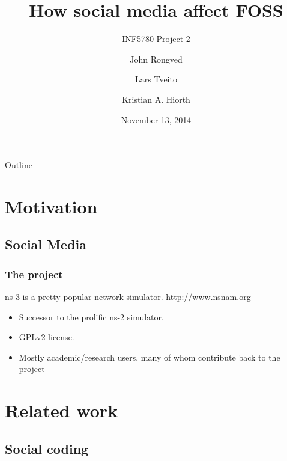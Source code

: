 \documentclass{beamer}
\title{How social media affect FOSS}
\subtitle{INF5780 Project 2}
\author{{John Rongved} \and {Lars Tveito} \and {Kristian A. Hiorth}}
\date{November 13, 2014}
\institute{Department of Informatics\\University of Oslo}
\begin{document}
\begin{frame}
  \titlepage
\end{frame}

\begin{frame}{Outline}
  \tableofcontents{}
\end{frame}

\section{Motivation}

\subsection{Social Media}

\begin{frame}
  \frametitle{The project}
  ns-3 is a pretty popular network simulator. {\small
    \url{http://www.nsnam.org}}

  \begin{itemize}
  \item Successor to the prolific ns-2 simulator.
  \item GPLv2 license.
  \item Mostly academic/research users, many of whom contribute back to
    the project
  \end{itemize}
\end{frame}


\section{Related work}

\subsection{Social coding}
\end{document}

